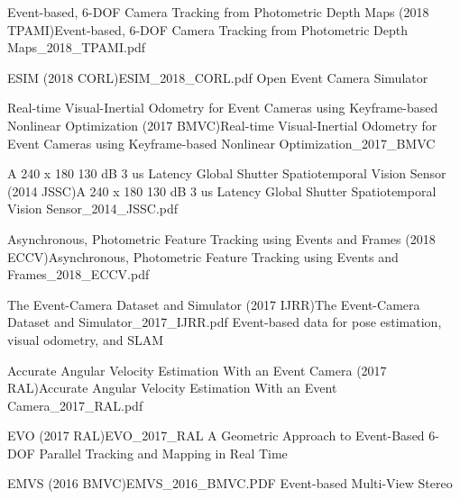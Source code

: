 \documentclass[10pt,a4paper]{scrartcl}
\begin{document}
\begin{multicols*}{2}
\begin{Paper}{Event-based, 6-DOF Camera Tracking from Photometric Depth Maps (2018 TPAMI)}{Event-based, 6-DOF Camera Tracking from Photometric Depth Maps_2018_TPAMI.pdf}
\end{Paper}

\begin{Paper}{ESIM (2018 CORL)}{ESIM_2018_CORL.pdf}
Open Event Camera Simulator
\end{Paper}

\begin{Paper}{Real-time Visual-Inertial Odometry for Event Cameras using Keyframe-based Nonlinear Optimization (2017 BMVC)}{Real-time Visual-Inertial Odometry for Event Cameras using Keyframe-based Nonlinear Optimization_2017_BMVC}
\end{Paper}

\begin{Paper}{A 240 x 180 130 dB 3 us Latency Global Shutter Spatiotemporal Vision Sensor (2014 JSSC)}{A 240 x 180 130 dB 3 us Latency Global Shutter Spatiotemporal Vision Sensor_2014_JSSC.pdf}
\end{Paper}

\begin{Paper}{Asynchronous, Photometric Feature Tracking using Events and Frames (2018 ECCV)}{Asynchronous, Photometric Feature Tracking using Events and Frames_2018_ECCV.pdf}
\end{Paper}

\begin{Paper}{The Event-Camera Dataset and Simulator (2017 IJRR)}{The Event-Camera Dataset and Simulator_2017_IJRR.pdf}
Event-based data for pose estimation, visual odometry, and SLAM
\end{Paper}

\begin{Paper}{Accurate Angular Velocity Estimation With an Event Camera (2017 RAL)}{Accurate Angular Velocity Estimation With an Event Camera_2017_RAL.pdf}
\end{Paper}

\begin{Paper}{EVO (2017 RAL)}{EVO_2017_RAL}
A Geometric Approach to Event-Based 6-DOF Parallel Tracking and Mapping in Real Time
\end{Paper}

\begin{Paper}{EMVS (2016 BMVC)}{EMVS_2016_BMVC.PDF}
Event-based Multi-View Stereo
\end{Paper}


\end{multicols*}
\end{document}
